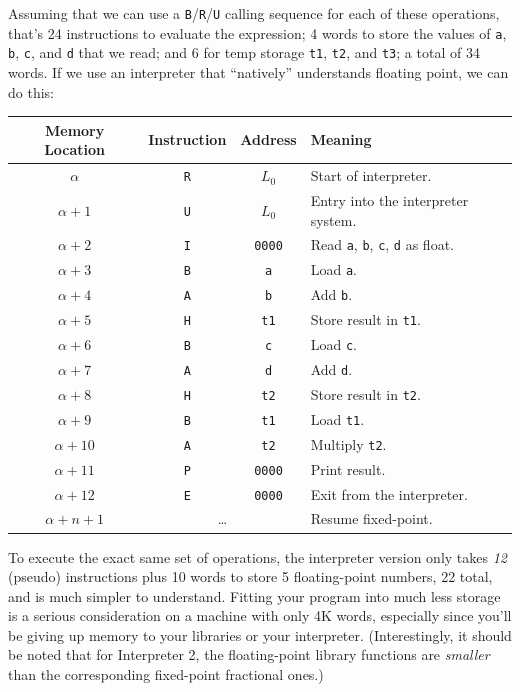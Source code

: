 Assuming that we can use a \texttt{B}/\texttt{R}/\texttt{U} calling sequence for each of these operations, that's 24 instructions to evaluate the expression; 4 words to store the values of \texttt{a}, \texttt{b}, \texttt{c}, and \texttt{d} that we read; and 6 for temp storage \texttt{t1}, \texttt{t2}, and \texttt{t3}; a total of 34 words. If we use an interpreter that ``natively'' understands floating point, we can do this:

\begin{table}[h!]
\centering
\begin{tabularx}{\textwidth}{cccX}
\toprule
\textbf{Memory Location} & \textbf{Instruction} & \textbf{Address} & \textbf{Meaning} \\
\midrule
$\alpha$     & \texttt{R} & $L_0$           & Start of interpreter. \\
$\alpha+1$   & \texttt{U} & $L_0$           & Entry into the interpreter system. \\
$\alpha+2$   & \texttt{I} & \texttt{0000}  & Read \texttt{a}, \texttt{b}, \texttt{c}, \texttt{d} as float. \\
$\alpha+3$   & \texttt{B} & \texttt{a}     & Load \texttt{a}. \\
$\alpha+4$   & \texttt{A} & \texttt{b}     & Add \texttt{b}. \\
$\alpha+5$   & \texttt{H} & \texttt{t1}    & Store result in \texttt{t1}. \\
$\alpha+6$   & \texttt{B} & \texttt{c}     & Load \texttt{c}. \\
$\alpha+7$   & \texttt{A} & \texttt{d}     & Add \texttt{d}. \\
$\alpha+8$   & \texttt{H} & \texttt{t2}    & Store result in \texttt{t2}. \\
$\alpha+9$   & \texttt{B} & \texttt{t1}    & Load \texttt{t1}. \\
$\alpha+10$  & \texttt{A} & \texttt{t2}    & Multiply \texttt{t2}. \\
$\alpha+11$  & \texttt{P} & \texttt{0000}  & Print result. \\
$\alpha+12$  & \texttt{E} & \texttt{0000}  & Exit from the interpreter. \\
$\alpha+n+1$ & \multicolumn{2}{c}{\dots}     & Resume fixed-point. \\
\bottomrule
\end{tabularx}
\end{table}

To execute the exact same set of operations, the interpreter version only takes \emph{12} (pseudo) instructions plus 10 words to store 5 floating-point numbers, 22 total, and is much simpler to understand. Fitting your program into much less storage is a serious consideration on a machine with only 4K words, especially since you'll be giving up memory to your libraries or your interpreter. (Interestingly, it should be noted that for Interpreter 2, the floating-point library functions are \emph{smaller} than the corresponding fixed-point fractional ones.)
